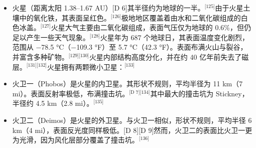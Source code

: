 \begin{itemize}
\item 火星（距离太阳 1.38–1.67 AU）[D 6]其半径约为地球的一半。\(^\text{[125]}\)由于火星土壤中的氧化铁，其表面呈红色。\(^\text{[126]}\)极地地区覆盖着由水和二氧化碳组成的白色冰盖。\(^\text{[127]}\)火星大气主要由二氧化碳组成，表面气压仅为地球的 0.6\%，但仍足以产生一些天气现象。\(^\text{[128]}\)火星年为 687 个地球日，其表面温度变化剧烈，范围从 −78.5 °C（−109.3 °F）至 5.7 °C（42.3 °F）。表面布满火山与裂谷，并富含多种矿物。\(^\text{[129][130]}\)火星内部结构高度分化，并在约 40 亿年前失去了磁层。\(^\text{[131][132]}\)火星拥有两颗微小卫星：\(^\text{[133]}\)
\item 火卫一（Phobos）是火星的内卫星。其形状不规则，平均半径为 11 km（7 mi）。表面反射率极低，布满撞击坑。\(^\text{[D 7][134]}\)其中最大的撞击坑为 Stickney，半径约 4.5 km（2.8 mi）。\(^\text{[135]}\)
\item 火卫二（Deimos）是火星的外卫星。与火卫一相似，形状不规则，平均半径 6 km（4 mi），表面反光度同样极低。[D 8][D 9]然而，火卫二的表面比火卫一更为光滑，因为风化层部分覆盖了撞击坑。\(^\text{[136]}\)
\end{itemize}
